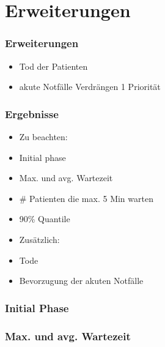 \documentclass{beamer}
\begin{document}
%
\section{Erweiterungen}
%
%
\begin{frame}
	\frametitle{Erweiterungen}
	\begin{itemize}
		\item Tod der Patienten
		\item akute Notf\"{a}lle Verdr\"{a}ngen 1 Priorit\"{a}t
	\end{itemize}
\end{frame}

%
%
%
\begin{frame}
	\frametitle{Ergebnisse}
	\begin{minipage}{.5\textwidth}
		\begin{flushleft}		
			\begin{itemize}
				\item[] Zu beachten:
				\item Initial phase
				\item Max. und avg. Wartezeit
				\item \# Patienten die max. 5 Min warten
				\item 90\% Quantile
			\end{itemize}
		\end{flushleft}
	\end{minipage}
	\begin{minipage}{.4\textwidth}
		\begin{flushright}
			\begin{itemize}
				\item[] Zus\"{a}tzlich:
				\item Tode
				\item Bevorzugung der akuten Notf\"{a}lle
			\end{itemize}
		\end{flushright}
	\end{minipage}
\end{frame}

\begin{frame}
	\frametitle{Initial Phase}
\end{frame}

\begin{frame}
	\frametitle{Max. und avg. Wartezeit}
\end{frame}
\end{document}
